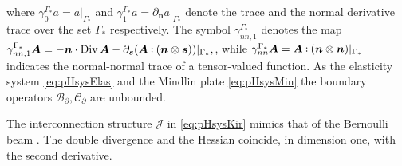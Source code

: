where $\gamma_{0}^{\Gamma_*}a = a\vert_{\Gamma_*}$ and  $\gamma_{1}^{\Gamma_*}a = \partial_{\bm{n}} a \vert_{\Gamma_*}$ denote the trace and the normal derivative trace over the set $\Gamma_*$ respectively. The symbol $\gamma_{nn, 1}^{\Gamma_*}$ denotes the map $\gamma_{nn, 1}^{\Gamma_*}\bm{A} = -\bm{n} \cdot \Div \bm{A} - \partial_{\bm{s}} (\bm{A} \cddot (\bm{n} \otimes \bm{s}))\vert_{\Gamma_*},$, while $\gamma_{nn}^{\Gamma_*}\bm{A} = \bm{A} \cddot (\bm{n} \otimes \bm{n})\vert_{\Gamma_*}$ indicates the normal-normal trace of a tensor-valued function. As the elasticity system \eqref{eq:pHsysElas} and the Mindlin plate \eqref{eq:pHsysMin} the boundary operators $\mathcal{B}_\partial, \mathcal{C}_\partial$ are unbounded. 

\begin{remark}
	The interconnection structure $\mathcal{J}$ in \eqref{eq:pHsysKir} mimics that of the Bernoulli beam \cite{cardoso2017}. The double divergence and the Hessian coincide, in dimension one, with the second derivative.
\end{remark}


